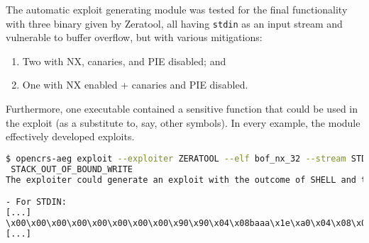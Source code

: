 \documentclass[../main.tex]{subfiles}
\begin{document}
The automatic exploit generating module was tested for the final functionality
with three binary given by Zeratool, all having \texttt{stdin} as an input
stream and vulnerable to buffer overflow, but with various mitigations:

\begin{enumerate}
  \def\labelenumi{\arabic{enumi}.}
  \tightlist
  \item
        Two with NX, canaries, and PIE disabled; and
  \item
        One with NX enabled + canaries and PIE disabled.
\end{enumerate}

Furthermore, one executable contained a sensitive function that could be used
in the exploit (as a substitute to, say, other symbols). In every example, the
module effectively developed exploits.

\begin{lstlisting}[captionpos=b,basicstyle=\tiny,language=Bash, caption=Example of Automatically Exploiting an Executable]
$ opencrs-aeg exploit --exploiter ZERATOOL --elf bof_nx_32 --stream STDIN --mitigation NX --weakness\
 STACK_OUT_OF_BOUND_WRITE
The exploiter could generate an exploit with the outcome of SHELL and the following payloads:

- For STDIN:
[...]
\x00\x00\x00\x00\x00\x00\x00\x00\x90\x90\x04\x08baaa\x1e\xa0\x04\x08\x00\x00\x00\x00\x00
[...]
\end{lstlisting}
\end{document}
